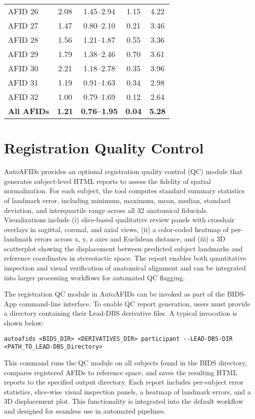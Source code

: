 \begin{table}[H]
\begin{tabular}{lcccc}
AFID 26 & 2.08 & 1.45--2.94 & 1.15 & 4.22 \\
AFID 27 & 1.47 & 0.80--2.10 & 0.21 & 3.46 \\
AFID 28 & 1.56 & 1.21--1.87 & 0.55 & 3.36 \\
AFID 29 & 1.79 & 1.38--2.46 & 0.70 & 3.61 \\
AFID 30 & 2.21 & 1.18--2.78 & 0.35 & 3.96 \\
AFID 31 & 1.19 & 0.91--1.63 & 0.34 & 2.98 \\
AFID 32 & 1.00 & 0.79--1.69 & 0.12 & 2.64 \\
\midrule
\textbf{All AFIDs} & \textbf{1.21} & \textbf{0.76--1.95} & \textbf{0.04} & \textbf{5.28} \\
\bottomrule
\end{tabular}
\end{table}

\newpage
\section{Registration Quality Control}
\label{app:registrationqualitycontrol}
AutoAFIDs provides an optional registration quality control (QC) module that generates subject-level HTML reports to assess the fidelity of spatial normalization. For each subject, the tool computes standard summary statistics of landmark error, including minimum, maximum, mean, median, standard deviation, and interquartile range across all 32 anatomical fiducials. Visualizations include (i) slice-based qualitative review panels with crosshair overlays in sagittal, coronal, and axial views, (ii) a color-coded heatmap of per-landmark errors across x, y, z axes and Euclidean distance, and (iii) a 3D scatterplot showing the displacement between predicted subject landmarks and reference coordinates in stereotactic space. The report enables both quantitative inspection and visual verification of anatomical alignment and can be integrated into larger processing workflows for automated QC flagging.

The registration QC module in AutoAFIDs can be invoked as part of the BIDS-App command-line interface. To enable QC report generation, users must provide a directory containing their Lead-DBS derivative files. A typical invocation is shown below:

\begin{verbatim}
autoafids <BIDS_DIR> <DERIVATIVES_DIR> participant --LEAD-DBS-DIR <PATH_TO_LEAD-DBS_Directory>
\end{verbatim}

This command runs the QC module on all subjects found in the BIDS directory, compares registered AFIDs to reference space, and saves the resulting HTML reports to the specified output directory. Each report includes per-subject error statistics, slice-wise visual inspection panels, a heatmap of landmark errors, and a 3D displacement plot. This functionality is integrated into the default workflow and designed for seamless use in automated pipelines.
\newpage
